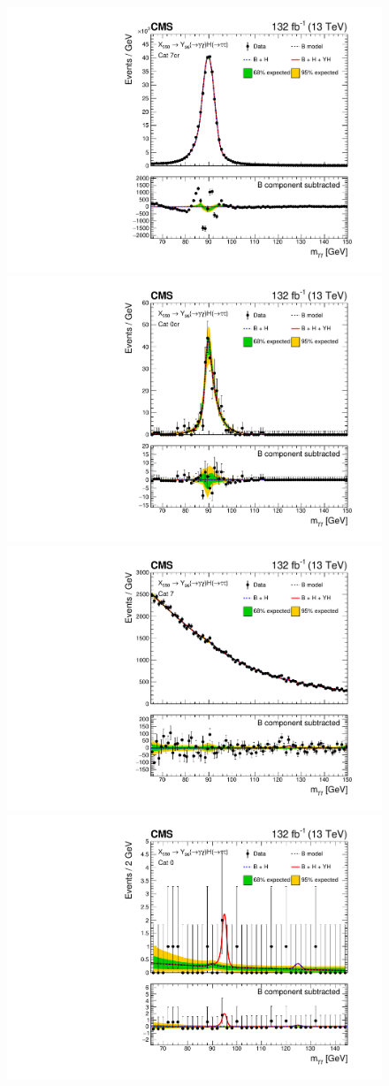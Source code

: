 \begin{figure}
  \centering
  \includegraphics[width=.45\linewidth]{Figures/Dihiggs/results/sb_models/y_gg_low_mass_mx650my95/ARCGL_Y_gg_Low_Mass_mx650my100mh95_ggttresmx650my100cat7cr_CMS_hgg_mass_nbins85_paper.pdf}
  \includegraphics[width=.45\linewidth]{Figures/Dihiggs/results/sb_models/y_gg_low_mass_mx650my95/ARCGL_Y_gg_Low_Mass_mx650my100mh95_ggttresmx650my100cat0cr_CMS_hgg_mass_nbins85_paper.pdf}
  \includegraphics[width=.45\linewidth]{Figures/Dihiggs/results/sb_models/y_gg_low_mass_mx650my95/ARCGL_Y_gg_Low_Mass_mx650my100mh95_ggttresmx650my100cat7_CMS_hgg_mass_nbins85_paper.pdf}
  \includegraphics[width=.45\linewidth]{Figures/Dihiggs/results/sb_models/y_gg_low_mass_mx650my95/ARCGL_Y_gg_Low_Mass_mx650my100mh95_ggttresmx650my100cat0_CMS_hgg_mass_nbins40_paper.pdf}

\end{figure}
